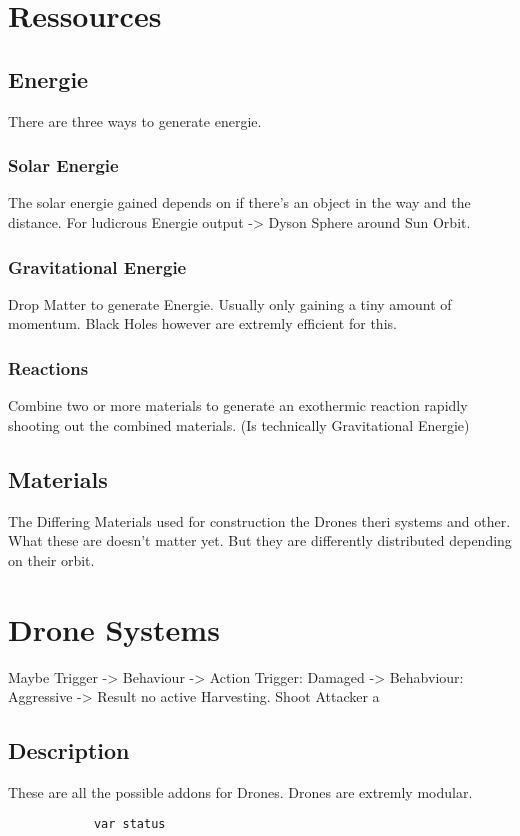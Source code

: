 \documentclass[a4paper]{scrreprt}
\begin{document}
\chapter{Ressources}
    \section{Energie}
        There are three ways to generate energie. 
        \subsection{Solar Energie}
            The solar energie gained depends on if there's an object in the way and the distance. For ludicrous  Energie output -> Dyson Sphere around Sun Orbit.
        \begin{alpha-feature}
            \subsection{Gravitational Energie}
                Drop Matter to generate Energie. Usually only gaining a tiny amount of momentum.
                Black Holes however are extremly efficient for this.
        \end{alpha-feature}
        \subsection{Reactions}
        Combine two or more materials to generate an exothermic reaction rapidly shooting out the combined materials. (Is technically Gravitational Energie)
    \section{Materials}
        The Differing Materials used for construction the Drones theri systems and other. What these are doesn't matter yet. But they are differently distributed depending on their orbit.
\chapter{Drone Systems}
    Maybe Trigger -> Behaviour -> Action
        Trigger: Damaged -> Behabviour: Aggressive -> Result  no active Harvesting. Shoot Attacker
    a\section{Description}
        These are all the possible addons for Drones. Drones are extremly modular. 
        \begin{verbatim}
            var status
        \end{verbatim}
\end{document}

